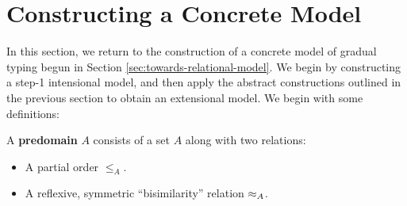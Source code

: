 \section{Constructing a Concrete Model}\label{sec:concrete-model}

In this section, we return to the construction of a concrete model of gradual
typing begun in Section \ref{sec:towards-relational-model}. We begin by constructing
a step-1 intensional model, and then apply the abstract constructions outlined
in the previous section to obtain an extensional model. We begin with some
definitions:
\begin{definition}
A \textbf{predomain} $A$ consists of a set $A$ along with two relations:
\begin{itemize}
    \item A partial order $\le_A$.
    \item A reflexive, symmetric ``bisimilarity'' relation $\approx_A$.
\end{itemize}
\end{definition}

